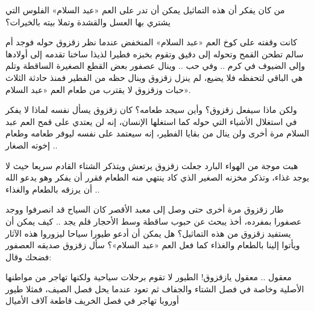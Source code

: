\documentclass[12pt]{article}
\newcommand{\TextOnlyPage}[1]{%
  \clearpage
  \thispagestyle{empty}
  \vspace*{2mm}
  #1
  \clearpage
}
\begin{document}
\TextOnlyPage{%
  من كان يفكر أن هذه التماثيل يمكن أن تدر على العم «عبد السلام» الفلوس التي يشتري بها العسل والقشدة وتملا بيته بالخيرات؟

  كانت وقفته على كوخ العم «عبد السلام» المنخفض عندما نظر زقزوق حوله فوجد أم سالم تطحن القمح وتحوله إلى دقيق وتقوم بخبزه فطيرا لذيذا ساخنا تقدمه إلى أولادها وإلى الضيوف في كرم .. وفي حب .. وينال عصفور بعض القطع الصغيرة الساقطة وتلم هي الباقي لتحفظه فلا يضيع، لم ينزل زقزوق وينال حظه من الفطير فمنذ حادثة الثلاث حبات وزقزوق لا يقترب من طعام العم «عبد السلام».

  ولكن ماذا سيفعل زقزوق؟ وأين سيجد طعامه؟ كان زقزوق يسأل نفسه لماذا لا يفكر في استغلال الأشياء التي حوله كما استغلها الإنسان، إنه لن يعتدي على قمح العم عبد السلام مرة أخرى ولن ينال من بقايا الفطير، إنه سيعتمد على نفسه ليوفر طعامه وطعام إخوته الصغار ..

  هبت موجة من الهواء البارد جعلت زقزوق يرتعش ويتذكر الشتاء القادم سريعا حيث لا يوجد غذاء، وتذكر مخزنه الصغير الذي كاد ينتهي منه الطعام فقرر أن يفكر وهو يدعو الله أن يرزقه بالطعام والغذاء ..

  طار زقزوق مرة أخرى حتى وصل إلى معبد الأقصر كان السياح قد انصرفوا ووجد عصفورا بمفرده، أخذ يبحث عن حبوب ساقطة وسط الأحجار فلم يجد .. كيف يمكن أن يستفيد زقزوق من هذه التماثيل؟ هل يمكن أن أدعو طيورا سياحا ليزوروا هذه الآثار ويأتوا إلينا بالطعام والغذاء كما فعل العم «عبد السلام»؟ سأل زقزوق صديقه العصفور فضحك وقال:

  معقول .. معقول يازقزوق! الطيور لا تقوم برحلات سياحية ولكنها تهاجر من مواطنها الأصلية وخاصة في فصل الشتاء والجفاف ثم تعود عندما يحل فصل الصيف، فمثلا طيور أوروبا تهاجر في فصل الخريف قاطعة آلاف الأميال
}
\end{document}
